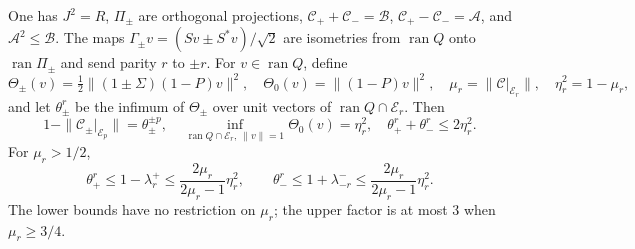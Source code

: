 \begin{lemma}\label{lem:T12:frame}
\label{lem:T12:instances}\label{prop:T12:dual}\label{prop:T12:master}
One has $J^2=R$, $\Pi_\pm$ are orthogonal projections,
$\mathcal C_++\mathcal C_-=\mathcal B$,
$\mathcal C_+-\mathcal C_-=\mathcal A$, and $\mathcal A^2\le\mathcal B$.
The maps $\Gamma_\pm v=(Sv\pm S^*v)/\sqrt2$ are isometries from
$\operatorname{ran}Q$ onto $\operatorname{ran}\Pi_\pm$ and send
parity $r$ to $\pm r$. For $v\in\operatorname{ran}Q$, define
\[
 \Theta_\pm(v)=\tfrac12\|(1\pm\Sigma)(1-P)v\|^2,\quad
 \Theta_0(v)=\|(1-P)v\|^2,\quad
 \mu_r=\|\mathcal C|_{\mathcal E_r}\|,\quad\eta_r^2=1-\mu_r,
\]
and let $\theta_\pm^r$ be the infimum of $\Theta_\pm$ over unit
vectors of $\operatorname{ran}Q\cap\mathcal E_r$. Then
\begin{equation}\label{eq:T12:dualid}
1-\|\mathcal C_\pm|_{\mathcal E_p}\|=\theta_\pm^{\pm p},\quad
\inf_{\operatorname{ran}Q\cap\mathcal E_r,\ \|v\|=1}\Theta_0(v)=\eta_r^2,
\quad\theta_+^r+\theta_-^r\le2\eta_r^2.
\end{equation}
For $\mu_r>1/2$,
\begin{equation}\label{eq:T12:master}
 \theta_+^r\le1-\lambda_r^+
 \le\frac{2\mu_r}{2\mu_r-1}\eta_r^2,\qquad
 \theta_-^r\le1+\lambda_{-r}^-
 \le\frac{2\mu_r}{2\mu_r-1}\eta_r^2.
\end{equation}
The lower bounds have no restriction on $\mu_r$; the upper factor is
at most $3$ when $\mu_r\ge3/4$.
\end{lemma}

